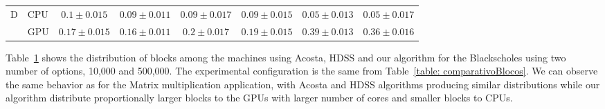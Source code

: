 \documentclass[journal]{IEEEtran}
\begin{document}
\begin{table}[htb]
\begin{scriptsize}
\begin{tabular}{|l|l|l|l|l|l|l|l|}
\hline
D & CPU & \multicolumn{1}{c|}{$0.1  \pm 0.015$} & \multicolumn{1}{c|}{$0.09 \pm 0.011$} & \multicolumn{1}{c|}{$0.09 \pm 0.017$} & \multicolumn{1}{c|}{$0.09 \pm 0.015$} & \multicolumn{1}{c|}{$0.05 \pm 0.013$} & \multicolumn{1}{c|}{$0.05 \pm 0.017$} \\ 
\cline{2-8}
 & GPU & \multicolumn{1}{c|}{$0.17 \pm 0.015$} & \multicolumn{1}{c|}{$0.16 \pm 0.011$} & \multicolumn{1}{c|}{$0.2 \pm 0.017$} & \multicolumn{1}{c|}{$0.19 \pm 0.015$} & \multicolumn{1}{c|}{$0.39 \pm 0.013$} & \multicolumn{1}{c|}{$0.36 \pm 0.016$} \\ 
\hline
\end{tabular}
\end{scriptsize}
\label{table: comparativoBlack}
\end{table}

Table~\ref{table: comparativoBlack} shows the distribution of blocks among the
machines using Acosta, HDSS and our algorithm for the Blackscholes using two
number of options, 10,000 and 500,000. The experimental configuration is the
same from Table~\ref{table: comparativoBlocos}. We can observe the same behavior
as for the Matrix multiplication application, with Acosta and HDSS algorithms
producing similar distributions while our algorithm distribute proportionally
larger blocks to the GPUs with larger number of cores and smaller blocks to
CPUs.
\end{document}
